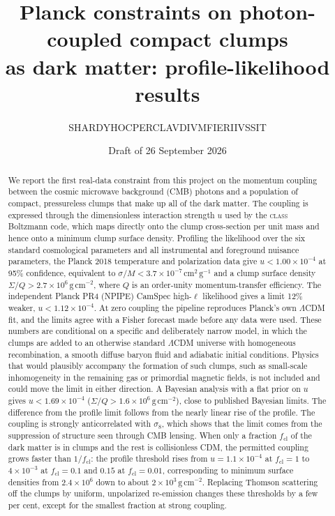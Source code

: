 \documentclass[11pt,a4paper]{article}
\title{Planck constraints on photon-coupled compact clumps\\ as dark matter: profile-likelihood results}
\author{S\textperiodcentered HARDY\textperiodcentered HOC\textperiodcentered PER\textperiodcentered CLAVDIVM\textperiodcentered FIERI\textperiodcentered IVSSIT}
\date{Draft of 26 September 2026}
\newcommand{\cl}{\mathrm{cl}}
\begin{document}
\maketitle

\begin{abstract}
We report the first real-data constraint from this project on the momentum coupling between the cosmic microwave background (CMB) photons and a population of compact, pressureless clumps that make up all of the dark matter. The coupling is expressed through the dimensionless interaction strength $u$ used by the \textsc{class} Boltzmann code, which maps directly onto the clump cross-section per unit mass and hence onto a minimum clump surface density. Profiling the likelihood over the six standard cosmological parameters and all instrumental and foreground nuisance parameters, the Planck 2018 temperature and polarization data give $u < 1.00\times10^{-4}$ at 95\% confidence, equivalent to $\sigma/M < 3.7\times10^{-7}\,\mathrm{cm^2\,g^{-1}}$ and a clump surface density $\Sigma/Q > 2.7\times10^{6}\,\mathrm{g\,cm^{-2}}$, where $Q$ is an order-unity momentum-transfer efficiency. The independent Planck PR4 (NPIPE) CamSpec high-$\ell$ likelihood gives a limit 12\% weaker, $u < 1.12\times10^{-4}$. At zero coupling the pipeline reproduces Planck's own $\Lambda$CDM fit, and the limits agree with a Fisher forecast made before any data were used. These numbers are conditional on a specific and deliberately narrow model, in which the clumps are added to an otherwise standard $\Lambda$CDM universe with homogeneous recombination, a smooth diffuse baryon fluid and adiabatic initial conditions. Physics that would plausibly accompany the formation of such clumps, such as small-scale inhomogeneity in the remaining gas or primordial magnetic fields, is not included and could move the limit in either direction. A Bayesian analysis with a flat prior on $u$ gives $u < 1.69\times10^{-4}$ ($\Sigma/Q > 1.6\times10^{6}\,\mathrm{g\,cm^{-2}}$), close to published Bayesian limits. The difference from the profile limit follows from the nearly linear rise of the profile. The coupling is strongly anticorrelated with $\sigma_8$, which shows that the limit comes from the suppression of structure seen through CMB lensing. When only a fraction $f_\cl$ of the dark matter is in clumps and the rest is collisionless CDM, the permitted coupling grows faster than $1/f_\cl$: the profile threshold rises from $u = 1.1\times10^{-4}$ at $f_\cl = 1$ to $4\times10^{-3}$ at $f_\cl = 0.1$ and $0.15$ at $f_\cl = 0.01$, corresponding to minimum surface densities from $2.4\times10^{6}$ down to about $2\times10^{3}\,\mathrm{g\,cm^{-2}}$. Replacing Thomson scattering off the clumps by uniform, unpolarized re-emission changes these thresholds by a few per cent, except for the smallest fraction at strong coupling.
\end{abstract}
\end{document}
